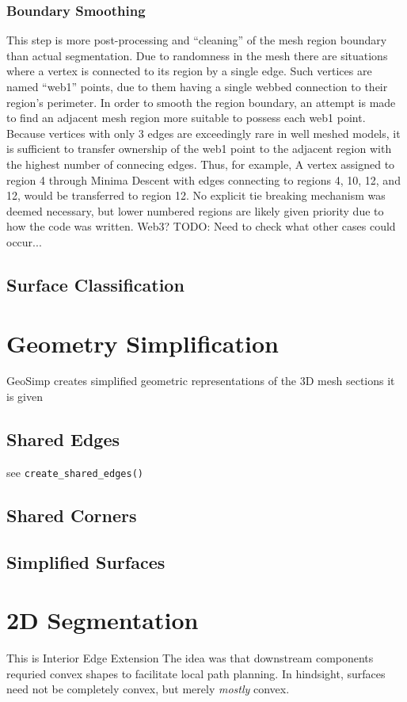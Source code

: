 \subsubsection{Boundary Smoothing}
This step is more post-processing and ``cleaning'' of the mesh region boundary than actual segmentation.
Due to randomness in the mesh there are situations where a vertex is connected to its region by a single edge.
Such vertices are named ``web1'' points, due to them having a single webbed connection to their region's perimeter.
In order to smooth the region boundary, an attempt is made to find an adjacent mesh region more suitable to possess each web1 point.
Because vertices with only 3 edges are exceedingly rare in well meshed models, it is sufficient to transfer ownership of the web1 point to the adjacent region with the highest number of connecing edges.
Thus, for example, A vertex assigned to region 4 through Minima Descent with edges connecting to regions 4, 10, 12, and 12, would be transferred to region 12.
No explicit tie breaking mechanism was deemed necessary, but lower numbered regions are likely given priority due to how the code was written.
Web3?
TODO: Need to check what other cases could occur...

\subsection{Surface Classification}

\section{Geometry Simplification}
GeoSimp creates simplified geometric representations of the 3D mesh sections it is given

\subsection{Shared Edges}
see \verb|create_shared_edges()|

\subsection{Shared Corners}

\subsection{Simplified Surfaces}

\section{2D Segmentation}
This is Interior Edge Extension
The idea was that downstream components requried convex shapes to facilitate local path planning.
In hindsight, surfaces need not be completely convex, but merely \textit{mostly} convex.

